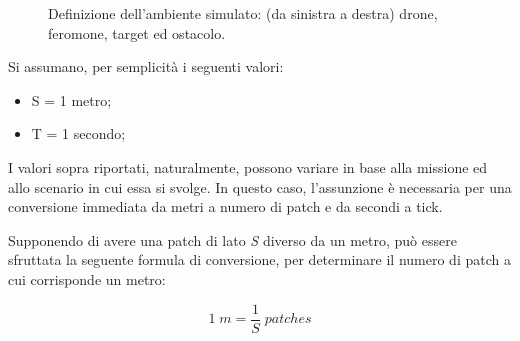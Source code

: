 \begin{figure}[H] 
    \captionsetup{justification=centering, margin=2cm, font=footnotesize}
    \begin{center}
    \end{center}
    \caption{Definizione dell'ambiente simulato: (da sinistra a destra) drone, feromone, target ed ostacolo.}
    \label{elementi_ambiente}
\end{figure}

Si assumano, per semplicità i seguenti valori:
\begin{itemize}
    \item S = 1 metro;
    \item T = 1 secondo; 
\end{itemize}

I valori sopra riportati, naturalmente, possono variare in base alla missione ed allo scenario in cui essa si svolge.
In questo caso, l'assunzione è necessaria per una conversione immediata da metri a numero di patch e da secondi a tick.

Supponendo di avere una patch di lato \textit{S} diverso da un metro, può essere sfruttata la seguente formula di conversione, per determinare il numero di patch a cui corrisponde un metro:

\begin{equation}
    \label{m_patches}
    1 \; m = \frac{1}{S} \; patches
\end{equation}


